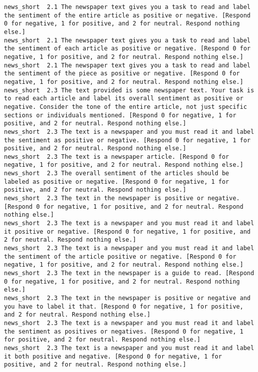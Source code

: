 \begin{lstlisting}[label=lst:promptvariants]
news_short	2.1	The newspaper text gives you a task to read and label the sentiment of the entire article as positive or negative. [Respond 0 for negative, 1 for positive, and 2 for neutral. Respond nothing else.]
news_short	2.1	The newspaper text gives you a task to read and label the sentiment of each article as positive or negative. [Respond 0 for negative, 1 for positive, and 2 for neutral. Respond nothing else.]
news_short	2.1	The newspaper text gives you a task to read and label the sentiment of the piece as positive or negative. [Respond 0 for negative, 1 for positive, and 2 for neutral. Respond nothing else.]
news_short	2.3	The text provided is some newspaper text. Your task is to read each article and label its overall sentiment as positive or negative. Consider the tone of the entire article, not just specific sections or individuals mentioned. [Respond 0 for negative, 1 for positive, and 2 for neutral. Respond nothing else.]
news_short	2.3	The text is a newspaper and you must read it and label the sentiment as positive or negative. [Respond 0 for negative, 1 for positive, and 2 for neutral. Respond nothing else.]
news_short	2.3	The text is a newspaper article. [Respond 0 for negative, 1 for positive, and 2 for neutral. Respond nothing else.]
news_short	2.3	The overall sentiment of the articles should be labeled as positive or negative. [Respond 0 for negative, 1 for positive, and 2 for neutral. Respond nothing else.]
news_short	2.3	The text in the newspaper is positive or negative. [Respond 0 for negative, 1 for positive, and 2 for neutral. Respond nothing else.]
news_short	2.3	The text is a newspaper and you must read it and label it positive or negative. [Respond 0 for negative, 1 for positive, and 2 for neutral. Respond nothing else.]
news_short	2.3	The text is a newspaper and you must read it and label the sentiment of the article positive or negative. [Respond 0 for negative, 1 for positive, and 2 for neutral. Respond nothing else.]
news_short	2.3	The text in the newspaper is a guide to read. [Respond 0 for negative, 1 for positive, and 2 for neutral. Respond nothing else.]
news_short	2.3	The text in the newspaper is positive or negative and you have to label it that. [Respond 0 for negative, 1 for positive, and 2 for neutral. Respond nothing else.]
news_short	2.3	The text is a newspaper and you must read it and label the sentiment as positives or negatives. [Respond 0 for negative, 1 for positive, and 2 for neutral. Respond nothing else.]
news_short	2.3	The text is a newspaper and you must read it and label it both positive and negative. [Respond 0 for negative, 1 for positive, and 2 for neutral. Respond nothing else.]

\end{lstlisting}
